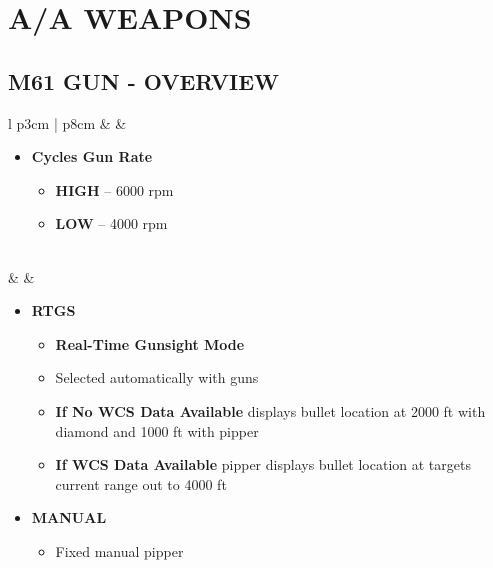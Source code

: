 \documentclass[8pt,usenames,dvipsnames,twoside]{article}
\begin{document}
		
	
		\cleardoublepage
		
		\section{A/A WEAPONS}
		
		\subsection{M61 GUN - OVERVIEW}
		\begin{center}
			\begin{longtable}{l p{3cm} | p{8cm}}
				\toprule
				\textbullet &  \hfill\null {} & 
				\begin{minipage}[t]{\linewidth}
					\vspace{-7pt}
					\begin{itemize}
						\item \textbf{Cycles Gun Rate}
						\begin{itemize}
							\item \textbf{HIGH} -- 6000 rpm
							\item \textbf{LOW} -- 4000 rpm
						\end{itemize} 
					\end{itemize} 
				\end{minipage} \\
				\midrule
				\textbullet &  & 
				\begin{minipage}[t]{\linewidth}
					\vspace{-7pt}
					\begin{itemize}
						\item \textbf{RTGS}
						\begin{itemize}
							\item \textbf{Real-Time Gunsight Mode}
							\item Selected automatically with guns
							\item \textbf{If No WCS Data Available} displays bullet location at 2000 ft with diamond and 1000 ft with pipper
							\item \textbf{If WCS Data Available} pipper displays bullet location at targets current range out to 4000 ft
						\end{itemize}
						\item \textbf{MANUAL} 
						\begin{itemize}
							\item Fixed manual pipper 

\end{itemize}
\end{itemize}
\end{minipage}
\end{longtable}
\end{center}
\end{document}
